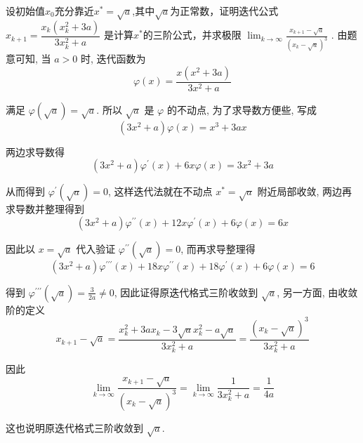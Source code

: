 \begin{tcolorbox}[breakable,
		colframe=white!10!jingga, coltitle=white!90!jingga, colback=white!95!jingga, coltext=black, colbacktitle=white!10!jingga, enhanced, fonttitle=\bfseries,fontupper=\normalsize, attach boxed title to top left={yshift=-2mm}, before skip=8pt, after skip=8pt,
		title=解答题]

设初始值$x_0$充分靠近$x^*=\sqrt{a}$,其中$\sqrt{a}$为正常数，证明迭代公式 $ x_{k+1}=\dfrac{x_{k}\left(x_{k}^{2}+3 a\right)}{3 x_{k}^{2}+a} $ 是计算$x^*$的三阶公式，并求极限 $\displaystyle \lim _{k \rightarrow \infty} \frac{x_{k+1}-\sqrt{a}}{\left(x_{k}-\sqrt{a}\right)^{3}} $ .
\tcblower
 由题意可知, 当 $ a>0 $ 时, 迭代函数为
$$
\varphi(x)=\frac{x\left(x^{2}+3 a\right)}{3 x^{2}+a}
$$

满足 $ \varphi(\sqrt{a})=\sqrt{a} $. 所以 $ \sqrt{a} $ 是 $ \varphi $ 的不动点, 为了求导数方便些, 写成
$$
\left(3 x^{2}+a\right) \varphi(x)=x^{3}+3 a x
$$

两边求导数得
$$
\left(3 x^{2}+a\right) \varphi^{\prime}(x)+6 x \varphi(x)=3 x^{2}+3 a
$$

从而得到 $ \varphi^{\prime}(\sqrt{a})=0 $, 这样迭代法就在不动点 $ x^{*}=\sqrt{a} $ 附近局部收敛, 两边再求导数并整理得到
$$
\left(3 x^{2}+a\right) \varphi^{\prime \prime}(x)+12 x \varphi^{\prime}(x)+6 \varphi(x)=6 x
$$

因此以 $ x=\sqrt{a} $ 代入验证 $ \varphi^{\prime \prime}(\sqrt{a})=0 $, 而再求导整理得
$$
\left(3 x^{2}+a\right) \varphi^{\prime \prime \prime}(x)+18 x \varphi^{\prime \prime}(x)+18 \varphi^{\prime}(x)+6 \varphi(x)=6
$$

得到 $ \varphi^{\prime \prime \prime}(\sqrt{a})=\frac{3}{2a} \neq 0 $, 因此证得原迭代格式三阶收敛到 $ \sqrt{a} $, 另一方面, 由收敛阶的定义
$$
x_{k+1}-\sqrt{a}=\frac{x_{k}^{2}+3 a x_{k}-3 \sqrt{a} x_{k}^{2}-a \sqrt{a}}{3 x_{k}^{2}+a}=\frac{\left(x_{k}-\sqrt{a}\right)^{3}}{3 x_{k}^{2}+a}
$$

因此
$$
\lim _{k \rightarrow \infty} \frac{x_{k+1}-\sqrt{a}}{\left(x_{k}-\sqrt{a}\right)^{3}}=\lim _{k \rightarrow \infty} \frac{1}{3 x_{k}^{2}+a}=\frac{1}{4 a}
$$

这也说明原迭代格式三阶收敛到 $ \sqrt{a} $.

\end{tcolorbox}

